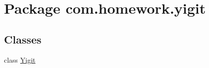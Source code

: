 \hypertarget{namespacecom_1_1homework_1_1yigit}{}\section{Package com.\+homework.\+yigit}
\label{namespacecom_1_1homework_1_1yigit}
\subsection*{Classes}
\begin{DoxyCompactItemize}
\item 
class \hyperlink{classcom_1_1homework_1_1yigit_1_1_yigit}{Yigit}
\end{DoxyCompactItemize}
